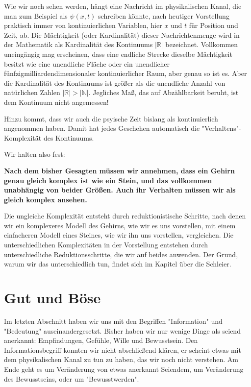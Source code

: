 \documentclass[12pt]{book}
\begin{document}
Wie wir noch sehen werden, hängt eine Nachricht im physikalischen Kanal, die man zum Beispiel als $\psi(x,t)$ schreiben könnte, nach heutiger Vorstellung praktisch immer von kontinuierlichen Variablen, hier $x$ und $t$ für Position und Zeit, ab. Die Mächtigkeit (oder Kardinalität) dieser Nachrichtenmenge wird in der Mathematik als Kardinalität des Kontinuums $|\mathbb{R}|$ bezeichnet. Vollkommen uneingängig mag erscheinen, dass eine endliche Strecke dieselbe Mächtigkeit besitzt wie eine unendliche Fläche oder ein unendlicher fünfzigmilliardendimensionaler kontinuierlicher Raum, aber genau so ist es. Aber die Kardinalität des Kontinuums ist größer als die unendliche Anzahl von natürlichen Zahlen $|\mathbb{R}| > |\mathbb{N}|$. Jegliches Maß, das auf Abzählbarkeit beruht, ist dem Kontinuum nicht angemessen!

Hinzu kommt, dass wir auch die psyische Zeit bislang als kontinuierlich angenommen haben. Damit hat jedes Geschehen automatisch die "Verhaltens"-Komplexität des Kontinuums.

Wir halten also fest:

\textbf{Nach dem bisher Gesagten müssen wir annehmen, dass ein Gehirn genau gleich komplex ist wie ein Stein, und das vollkommen unabhängig von beider Größen. Auch ihr Verhalten müssen wir als gleich komplex ansehen.} 

Die ungleiche Komplexität entsteht durch reduktionistische Schritte, nach denen wir ein komplexeres Modell des Gehirns, wie wir es uns vorstellen, mit einem einfacheren Modell eines Steines, wie wir ihn uns vorstellen, vergleichen. Die unterschiedlichen Komplexitäten in der Vorstellung entstehen durch unterschiedliche Reduktionsschritte, die wir auf beides anwenden. Der Grund, warum wir das unterschiedlich tun, findet sich im Kapitel über die Schleier. 

\section{Gut und Böse}

Im letzten Abschnitt haben wir uns mit den Begriffen "Information" und "Bedeutung" auseinandergesetzt. Bisher haben wir nur wenige Dinge als seiend anerkannt: Empfindungen, Gefühle, Wille und Bewusstsein. Den Informationsbegriff konnten wir nicht abschließend klären, er scheint etwas mit dem physikalischen Kanal zu tun zu haben, das wir noch nicht  verstehen. Am Ende geht es um Veränderung von etwas anerkannt Seiendem, um Veränderung des Bewusstseins, oder um "Bewusstwerden".
\end{document}
